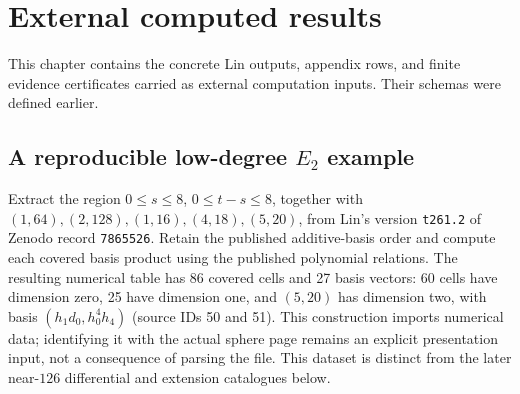\chapter{External computed results}
\label{chap:computed-inputs}

This chapter contains the concrete Lin outputs, appendix rows, and finite evidence certificates carried as external computation inputs.  Their schemas were defined earlier.

\section{A reproducible low-degree $E_2$ example}

\begin{definition}
  \label{def:lin-low-degree-table}
  Extract the region $0\le s\le8$, $0\le t-s\le8$, together with
  $(1,64),(2,128),(1,16),(4,18),(5,20)$, from Lin's version
  \texttt{t261.2} of Zenodo record \texttt{7865526}.
  Retain the published additive-basis order and compute each covered basis
  product using the published polynomial relations.
  The resulting numerical table has 86 covered cells and 27 basis vectors:
  60 cells have dimension zero, 25 have dimension one, and $(5,20)$ has
  dimension two, with basis $(h_1d_0,h_0^4h_4)$ (source IDs 50 and 51).
  This construction imports numerical data; identifying it with the actual
  sphere page remains an explicit presentation input, not a consequence of
  parsing the file.  This dataset is distinct from the later near-$126$
  differential and extension catalogues below.
\end{definition}

